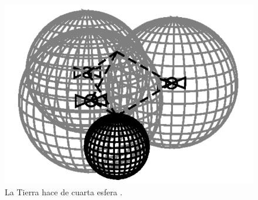 \begin{figure}
	\centering
	\includegraphics[width=1\textwidth]{imagenes/tierra4esfera.PNG}
	\caption{\label{fig1}La Tierra hace de cuarta esfera \cite{gnss}.}
\end{figure}

